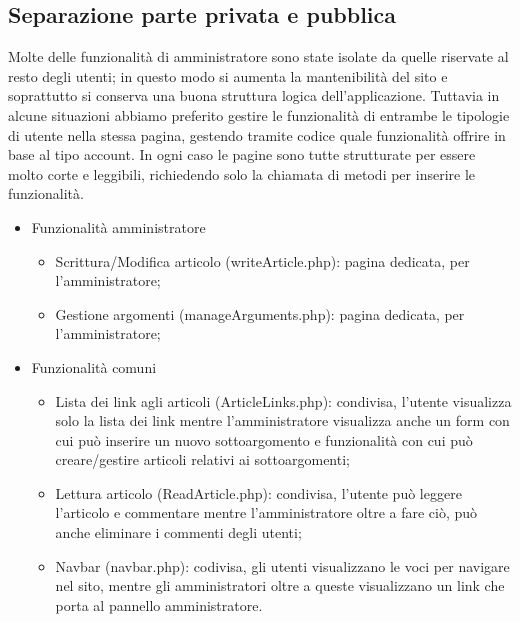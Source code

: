 \documentclass[12pt]{article}
\begin{document}
	\subsection{Separazione parte privata e pubblica}
	Molte delle funzionalità di amministratore sono state isolate da quelle riservate al resto degli utenti; in questo modo si aumenta la mantenibilità del sito e soprattutto si conserva una buona struttura logica dell'applicazione. Tuttavia in alcune situazioni abbiamo preferito gestire le funzionalità di entrambe le tipologie di utente nella stessa pagina, gestendo tramite codice quale funzionalità offrire in base al tipo account. In ogni caso le pagine sono tutte strutturate per essere molto corte e leggibili, richiedendo solo la chiamata di metodi per inserire le funzionalità.
	\begin{itemize}
		\item Funzionalità amministratore
			\begin{itemize}
				\item Scrittura/Modifica articolo (writeArticle.php): pagina dedicata, per l'amministratore;
				\item Gestione argomenti (manageArguments.php): pagina dedicata, per l'amministratore;
			\end{itemize}
		\item Funzionalità comuni
			\begin{itemize}
				\item Lista dei link agli articoli (ArticleLinks.php): condivisa, l'utente visualizza solo la lista dei link mentre l'amministratore visualizza anche un form con cui può inserire un nuovo sottoargomento e funzionalità con cui può creare/gestire articoli relativi ai sottoargomenti;
				\item Lettura articolo (ReadArticle.php): condivisa, l'utente può leggere l'articolo e commentare mentre l'amministratore oltre a fare ciò, può anche eliminare i commenti degli utenti;
				\item Navbar (navbar.php): codivisa, gli utenti visualizzano le voci per navigare nel sito, mentre gli amministratori oltre a queste visualizzano un link che porta al pannello amministratore.
			\end{itemize}
	\end{itemize}
\end{document}
